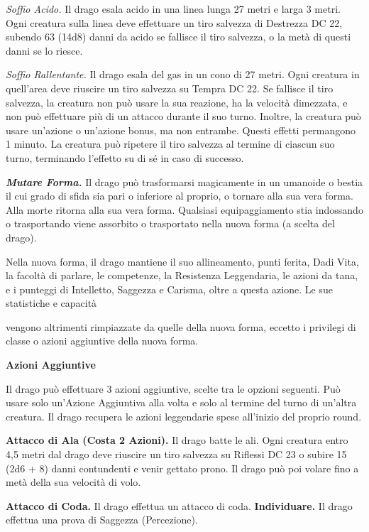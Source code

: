 \begin{multicols}{2}
\emph{Soffio Acido.} Il drago esala acido in una linea lunga 27 metri e
larga 3 metri. Ogni creatura sulla linea deve effettuare un tiro
salvezza di Destrezza DC 22, subendo 63 (14d8) danni da acido se
fallisce il tiro salvezza, o la metà di questi danni se lo riesce.

\emph{Soffio Rallentante.} Il drago esala del gas in un cono di 27
metri. Ogni creatura in quell'area deve riuscire un tiro salvezza su Tempra DC 22. Se fallisce il tiro salvezza, la creatura non può
usare la sua reazione, ha la velocità dimezzata, e non può effettuare
più di un attacco durante il suo turno. Inoltre, la creatura può usare
un'azione o un'azione bonus, ma non entrambe. Questi effetti permangono
1 minuto. La creatura può ripetere il tiro salvezza al termine di
ciascun suo turno, terminando l'effetto su di sé in caso di successo.

\emph{\textbf{Mutare Forma.}} Il drago può trasformarsi magicamente in
un umanoide o bestia il cui grado di sfida sia pari o inferiore al
proprio, o tornare alla sua vera forma. Alla morte ritorna alla sua vera
forma. Qualsiasi equipaggiamento stia indossando o trasportando viene
assorbito o trasportato nella nuova forma (a scelta del drago).

Nella nuova forma, il drago mantiene il suo allineamento, punti ferita,
Dadi Vita, la facoltà di parlare, le competenze, la Resistenza
Leggendaria, le azioni da tana, e i punteggi di Intelletto, Saggezza e
Carisma, oltre a questa azione. Le sue statistiche e capacità

vengono altrimenti rimpiazzate da quelle della nuova forma, eccetto i
privilegi di classe o azioni aggiuntive della nuova forma.

\textbf{Azioni Aggiuntive}

Il drago può effettuare 3 azioni aggiuntive, scelte tra le opzioni
seguenti. Può usare solo un'Azione Aggiuntiva alla volta e solo al
termine del turno di un'altra creatura. Il drago recupera le azioni
leggendarie spese all'inizio del proprio round.

\textbf{Attacco di Ala (Costa 2 Azioni).} Il drago batte le ali. Ogni
creatura entro 4,5 metri dal drago deve riuscire un tiro salvezza su Riflessi DC 23 o subire 15 (2d6 + 8) danni contundenti e venir gettato
prono. Il drago può poi volare fino a metà della sua velocità di volo.

\textbf{Attacco di Coda.} Il drago effettua un attacco di coda.
\textbf{Individuare.} Il drago effettua una prova di Saggezza
(Percezione).




\end{multicols}
